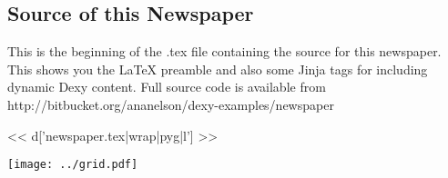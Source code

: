 \documentclass[custom, plainsections]{sciposter}
\begin{document}
\begin{multicols*}{2}
\pagebreak

\subsection*{Source of this Newspaper}

This is the beginning of the .tex file containing the source for this newspaper. This shows you the LaTeX preamble and also some Jinja tags for including dynamic Dexy content. Full source code is available from http://bitbucket.org/ananelson/dexy-examples/newspaper

\tiny
<< d['newspaper.tex|wrap|pyg|l'] >>
\small

\texttt{[image: ../grid.pdf]}

\end{multicols*}
\end{document}
